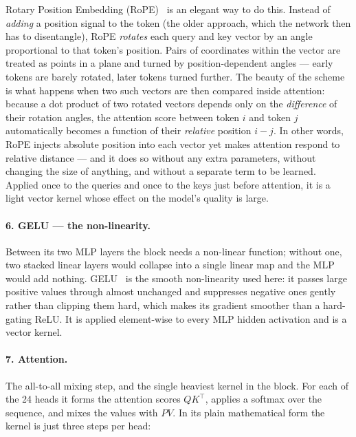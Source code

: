 \documentclass[11pt]{report}
\begin{document}
Rotary Position Embedding (RoPE)~\cite{su2021roformer} is an elegant way to
do this. Instead of
\emph{adding} a position signal to the token (the older approach, which
the network then has to disentangle), RoPE \emph{rotates} each query and
key vector by an angle proportional to that token's position. Pairs of
coordinates within the vector are treated as points in a plane and turned
by position-dependent angles --- early tokens are barely rotated, later
tokens turned further. The beauty of the scheme is what happens when two
such vectors are then compared inside attention: because a dot product of
two rotated vectors depends only on the \emph{difference} of their
rotation angles, the attention score between token $i$ and token $j$
automatically becomes a function of their \emph{relative} position
$i-j$. In other words, RoPE injects absolute position into each vector
yet makes attention respond to relative distance --- and it does so
without any extra parameters, without changing the size of anything, and
without a separate term to be learned. Applied once to the queries and
once to the keys just before attention, it is a light vector kernel whose
effect on the model's quality is large.

\paragraph{6. GELU --- the non-linearity.} Between its two MLP layers the
block needs a non-linear function; without one, two stacked linear layers
would collapse into a single linear map and the MLP would add nothing.
GELU~\cite{hendrycks2016gelu} is the smooth non-linearity used here: it
passes large positive values through almost unchanged and suppresses
negative ones gently rather than clipping them hard, which makes its
gradient smoother than a hard-gating ReLU. It is applied element-wise to every MLP hidden
activation and is a vector kernel.

\paragraph{7. Attention.} The all-to-all mixing step, and the single
heaviest kernel in the block. For each of the 24 heads it forms the
attention scores $QK^\top$, applies a softmax over the sequence, and mixes
the values with $PV$. In its plain mathematical form the kernel is just
three steps per head:

\begin{algorithm}[H]
\DontPrintSemicolon
{}
\caption{Attention (full bidirectional, no mask, no KV cache)}
\end{algorithm}
\end{document}
